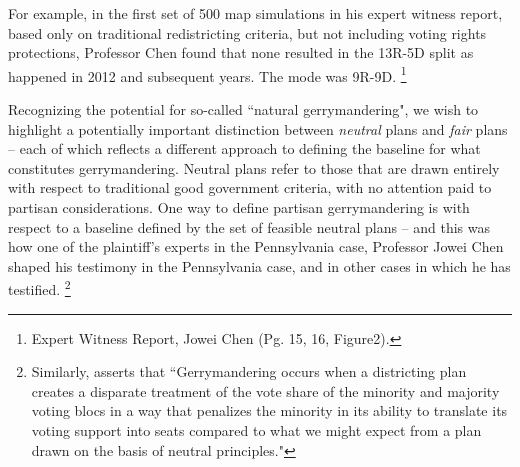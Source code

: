    For example, in the first set of 500 map simulations in his expert witness report, based only on traditional redistricting criteria, but not including voting rights protections, Professor Chen found that none resulted in the 13R-5D split as happened in 2012 and subsequent years. The mode was 9R-9D.
        \footnote{Expert Witness Report, Jowei Chen (Pg. 15, 16, Figure2).}
\par
    Recognizing the potential for so-called ``natural gerrymandering", we wish to highlight a potentially important distinction between \textit{neutral} plans and \textit{fair} plans -- each of which reflects a different approach to defining the baseline for what constitutes gerrymandering. Neutral plans refer to those that are drawn entirely with respect to traditional good government criteria, with no attention paid to partisan considerations. One way to define partisan gerrymandering is with respect to a baseline defined by the set of feasible neutral plans -- and this was how one of the plaintiff’s experts in the Pennsylvania case, Professor Jowei Chen \citep[cf.][]{Chen2015_JOP} shaped his testimony in the Pennsylvania case, and in other cases in which he has testified.
        \footnote{Similarly, \citet{Grofman2018_ELJ} asserts that ``Gerrymandering occurs when a districting plan creates a disparate treatment of the vote share of the minority and majority voting blocs in a way that penalizes the minority in its ability to translate its voting support into seats compared to what we might expect from a plan drawn on the basis of neutral principles."}
